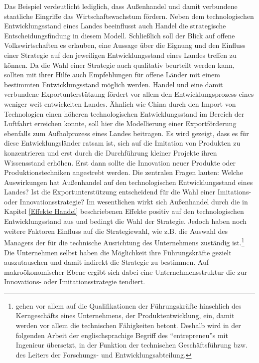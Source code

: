 Das Beispiel verdeutlicht lediglich, dass Au{\ss}enhandel und damit verbundene staatliche Eingriffe  das Wirtschaftswachstum fördern. Neben dem technologischen Entwicklungsstand eines Landes beeinflusst auch Handel die strategische Entscheidungsfindung in diesem Modell. Schlie{\ss}lich soll der Blick auf offene Volkswirtschaften es erlauben, eine Aussage über die Eignung und den Einfluss einer Strategie auf den jeweiligen Entwicklungsstand eines Landes treffen zu können. Da die Wahl einer Strategie auch qualitativ  beurteilt werden kann, sollten mit ihrer Hilfe auch Empfehlungen für offene Länder mit einem bestimmten Entwicklungsstand möglich werden. 
Handel und eine damit verbundene Exportunterst{\"u}tzung fördert vor allem den Entwicklungsprozess eines weniger weit entwickelten Landes. Ähnlich wie China durch den Import von Technologien einen höheren technologischen Entwicklungsstand im Bereich der Luftfahrt erreichen konnte, soll hier die Modellierung einer Exportförderung ebenfalls zum Aufholprozess eines Landes beitragen. Es wird gezeigt, dass es f{\"u}r diese Entwicklungsl{\"a}nder ratsam ist, sich auf die Imitation von Produkten zu konzentrieren und erst durch die Durchführung kleiner Projekte ihren Wissensstand erh{\"o}hen. Erst dann sollte die Innovation neuer Produkte oder Produktionstechniken angestrebt werden. Die zentralen Fragen lauten: Welche Auswirkungen hat Au{\ss}enhandel auf den technologischen Entwicklungsstand eines Landes? Ist die Exportunterst{\"u}tzung entscheidend f{\"u}r die Wahl einer Imitations- oder Innovationsstrategie? Im wesentlichen wirkt sich Au{\ss}enhandel durch die in Kapitel \ref{Effekte Handel} beschriebenen Effekte positiv auf den technologischen Entwicklungsstand aus und bedingt die Wahl der Strategie.
Jedoch haben noch weitere Faktoren Einfluss auf die Strategiewahl, wie z.B. die Auswahl des Managers der für die technische Ausrichtung des Unternehmens zuständig ist.\footnote{\citet{Acemoglu.2006} gehen vor allem auf die Qualifikationen der Führungskräfte hinschlich des Kerngeschäfts eines Unternehmens, der Produktentwicklung, ein, damit werden vor allem die technischen Fähigkeiten betont. Deshalb wird in der folgenden Arbeit der englischsprachige Begriff des "`entrepreneu"'s mit Ingenieur übersetzt, in der Funktion der technischen Geschäftsführung bzw. des Leiters der Forschungs- und Entwicklungsabteilung.} Die Unternehmen selbst haben die Möglichkeit ihre Führungskräfte gezielt auszutauschen und damit indirekt die Strategie zu bestimmen. Auf makroökonomischer Ebene ergibt sich dabei eine Unternehmensstruktur die zur Innovations- oder Imitationsstrategie tendiert. 
